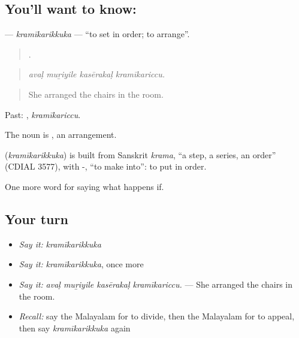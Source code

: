 \subsection*{You'll want to know: }
\textbf{} — \emph{kramīkarikkuka} — \textquotedblleft{}to set in order; to arrange\textquotedblright{}.

\begin{quote}
   .
\end{quote}

\begin{quote}
\emph{avaḷ muṟiyile kasērakaḷ kramīkariccu.}
\end{quote}

\begin{quote}
She arranged the chairs in the room.
\end{quote}

Past: , \emph{kramīkariccu}.

The noun is , an arrangement.

\begin{cousinweb}
\textbf{} (\emph{kramīkarikkuka}) is built from Sanskrit \emph{krama}, \textquotedblleft{}a step, a series, an order\textquotedblright{} (CDIAL 3577), with -, \textquotedblleft{}to make into\textquotedblright{}: to put in order.
\end{cousinweb}

\begin{grammarlens}[title={What you've built}]
One more word for saying what happens if.
\end{grammarlens}

\subsection*{Your turn}
\begin{itemize}
\raggedright
  \item \emph{Say it:} \emph{kramīkarikkuka}
  \item \emph{Say it:} \emph{kramīkarikkuka}, once more
  \item \emph{Say it:} \emph{avaḷ muṟiyile kasērakaḷ kramīkariccu.} — She arranged the chairs in the room.
  \item \emph{Recall:} say the Malayalam for to divide, then the Malayalam for to appeal, then say \emph{kramīkarikkuka} again
\end{itemize}

